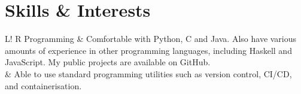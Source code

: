 \documentclass[10pt, a4paper]{article}
\newcommand\vsep{\color{lightgray} \vrule width 0.5pt}
\newcommand\sect[1]{\section*{\hspace{.05cm} \Large\sc #1}}
\begin{document}
        \sect{Skills \& Interests}
            \begin{tabular}{L!{\vsep}R}
                Programming &
                    Comfortable with Python, C and Java.
                    Also have various amounts of experience in other programming languages, including Haskell and JavaScript.
                    My public projects are available on GitHub.
                    \vspace{0.5\baselineskip} \\
                 &
                    Able to use standard programming utilities such as version control, CI/CD, and containerisation.
                    \vspace{0.5\baselineskip} \\
            \end{tabular}
    
\end{document}

